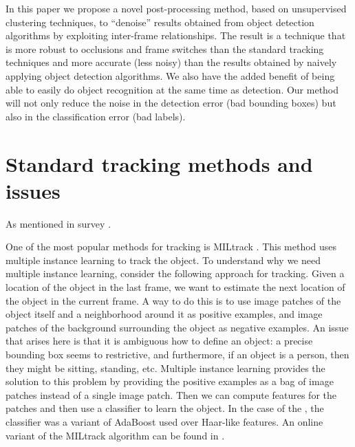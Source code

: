 \documentclass{article}
\begin{document}
In this paper we propose a novel post-processing method, based on unsupervised clustering techniques, to ``denoise'' results obtained
from object detection algorithms by exploiting inter-frame relationships. The result is a technique that is more robust to occlusions and frame switches than the standard
tracking techniques and more accurate (less noisy) than the results obtained by naively applying object detection algorithms. We also have the added benefit of being able to easily
do object recognition at the same time as detection. Our method will not only reduce the noise in the detection error (bad bounding boxes) but also in the classification error (bad labels).

\section{Standard tracking methods and issues}

As mentioned in survey \cite{benchmarksurvey}.

One of the most popular methods for tracking is MILtrack \cite{miltrack}. This
method uses multiple instance learning to track the object. To understand
why we need multiple instance learning, consider the following approach for tracking.
Given a location of the object in the last frame, we want to estimate the next location
of the object in the current frame. A way to do this is to use image patches of the object
itself and a neighborhood around it as positive examples, and image patches of
the background surrounding the object as negative examples. An issue that arises
here is that it is ambiguous how to define an object: a precise bounding box seems
to restrictive, and furthermore, if an object is a person, then they might be sitting,
standing, etc. Multiple instance learning provides the solution to this problem
by providing the positive examples as a bag of image patches instead of a
single image patch. Then we can compute features for the patches and then
use a classifier to learn the object. In the case of the \cite{miltrack},
the classifier was a variant of AdaBoost used over Haar-like features. An online
variant of the MILtrack algorithm can be found in \cite{miltrackonline}.

\cite{OLB} %
\cite{IVT} %
\cite{L1} %
\end{document}
